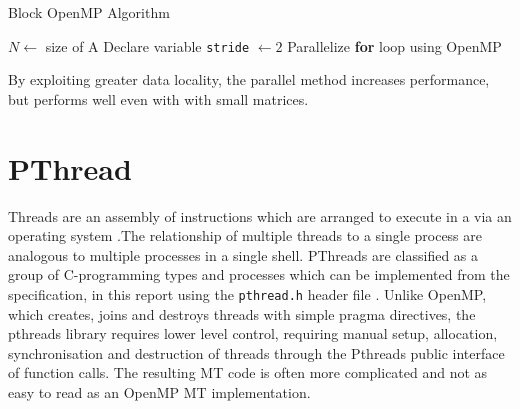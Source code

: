 \documentclass[10 pt, conference]{cssconf}
\begin{document}
\begin{multicols}{2}
\vspace{5pt}
\begin{algorithm}[H]
    \small
    \caption{Block OpenMP Algorithm}\label{pc:omp-block}
    	\SetAlgoLined
	$N \leftarrow$ size of A
	Declare variable \texttt{stride} $\leftarrow 2$
	Parallelize \textbf{for} loop using OpenMP
	\vspace{3pt}
\end{algorithm}%
\vspace{5pt}

By exploiting greater data locality, the parallel method increases performance, but performs well even with with small matrices.

\section{PThread}
Threads are an assembly of instructions which are arranged to execute in a via an operating system \cite{lewis1996pthreads}.The relationship of multiple threads to a single process are analogous to multiple processes in a single shell. PThreads are classified as a group of C-programming types and processes which can be implemented from the specification, in this report using the \verb|pthread.h| header file \cite{lewis1996pthreads}. Unlike OpenMP, which creates, joins and destroys threads with simple pragma directives, the pthreads library requires lower level control, requiring manual setup, allocation, synchronisation and destruction of threads through the Pthreads public interface of function calls. The resulting MT code is often more complicated and not as easy to read as an OpenMP MT implementation.


\end{multicols}
\end{document}
